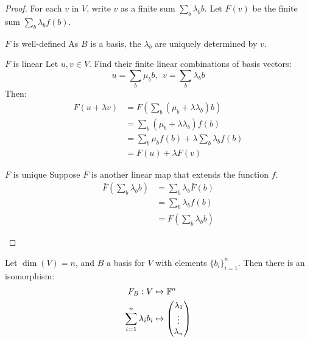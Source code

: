 \documentclass[../Main.tex]{subfiles}
\begin{document}
\begin{proof}
    For each $v$ in $V$, write $v$ as a finite sum $\sum_{b} \lambda_b b$. Let $F(v)$ be the finite sum $\sum_b \lambda_b f(b)$.

    \begin{subproof}{$F$ is well-defined}
        As $B$ is a basis, the $\lambda_b$ are uniquely determined by $v$.
    \end{subproof}
    \begin{subproof}{$F$ is linear}
        Let $u, v \in V$. Find their finite linear combinations of basis vectors:
        \begin{equation*}
            u = \sum_b \mu_b b,~~v = \sum_b \lambda_b b
        \end{equation*}
        Then:
        \begin{align*}
            F(u + \lambda v) &= F\left(\sum_b (\mu_b + \lambda\lambda_b)b\right) \\
            &= \sum_b (\mu_b + \lambda \lambda_b) f(b) \\
            &= \sum_b \mu_b f(b) + \lambda\sum_b\lambda_b f(b) \\
            &= F(u) + \lambda F(v)
        \end{align*}
    \end{subproof}
    \begin{subproof}{$F$ is unique}
        Suppose $\bar{F}$ is another linear map that extends the function $f$.
        \begin{align*}
            \bar{F} \left(\sum_b \lambda_b b\right) &= \sum_b\lambda_b \bar{F}(b) \\
            &= \sum_b \lambda_b f(b) \\
            &= F\left(\sum_b \lambda_b b\right)
        \end{align*}
    \end{subproof}
\end{proof}
\begin{corollary}
    Let $\dim(V) = n$, and $B$ a basis for $V$ with elements $\{b_i\}_{i=1}^n$. Then there is an isomorphism:
    \begin{align*}
        F_B : V &\mapsto \mathbb{F}^n\\
        \sum_{i=1}^n \lambda_i b_i &\mapsto \begin{pmatrix} \lambda_1 \\ \vdots \\ \lambda_n \end{pmatrix}
    \end{align*}
    \label{corCoordinateVector}
\end{corollary}
\end{document}
